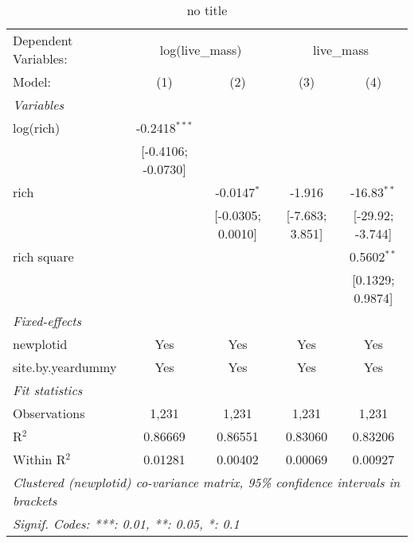 
\begin{table}[htbp]
   \caption{no title}
   \centering
   \begin{tabular}{lcccc}
      \tabularnewline \midrule \midrule
      Dependent Variables: & \multicolumn{2}{c}{log(live\_mass)} & \multicolumn{2}{c}{live\_mass}\\
      Model:            & (1)                & (2)               & (3)             & (4)\\  
      \midrule
      \emph{Variables}\\
      log(rich)         & -0.2418$^{***}$    &                   &                 &   \\   
                        & [-0.4106; -0.0730] &                   &                 &   \\   
      rich              &                    & -0.0147$^{*}$     & -1.916          & -16.83$^{**}$\\   
                        &                    & [-0.0305; 0.0010] & [-7.683; 3.851] & [-29.92; -3.744]\\   
      rich square       &                    &                   &                 & 0.5602$^{**}$\\   
                        &                    &                   &                 & [0.1329; 0.9874]\\   
      \midrule
      \emph{Fixed-effects}\\
      newplotid         & Yes                & Yes               & Yes             & Yes\\  
      site.by.yeardummy & Yes                & Yes               & Yes             & Yes\\  
      \midrule
      \emph{Fit statistics}\\
      Observations      & 1,231              & 1,231             & 1,231           & 1,231\\  
      R$^2$             & 0.86669            & 0.86551           & 0.83060         & 0.83206\\  
      Within R$^2$      & 0.01281            & 0.00402           & 0.00069         & 0.00927\\  
      \midrule \midrule
      \multicolumn{5}{l}{\emph{Clustered (newplotid) co-variance matrix, 95\% confidence intervals in brackets}}\\
      \multicolumn{5}{l}{\emph{Signif. Codes: ***: 0.01, **: 0.05, *: 0.1}}\\
   \end{tabular}
\end{table}


